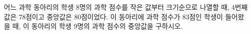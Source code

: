어느 과학 동아리의 학생 8명의 과학 점수를 작은 값부터 크기순으로 나열할 때, 4번째 값은 78점이고 중앙값은 80점이었다. 이 동아리에 과학 점수가 83점인 학생이 들어왔을 때, 이 동아리의 학생 9명의 과학 점수의 중앙값을 구하시오.

